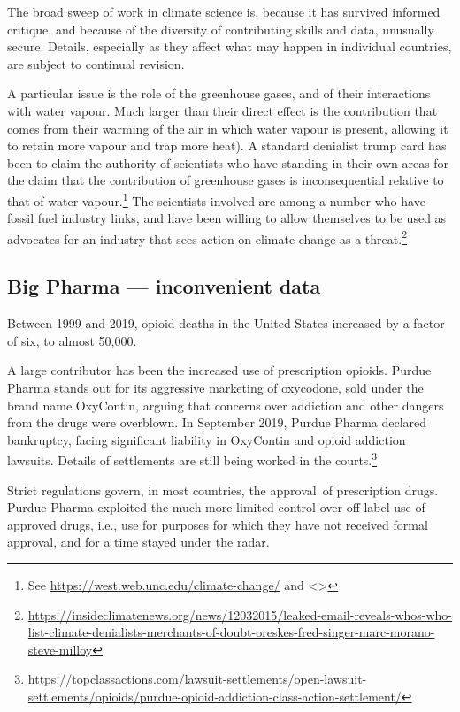 \documentclass[
  10pt,
  b5paper]{book}
\begin{document}
The broad sweep of work in climate science is, because it has survived
informed critique, and because of the diversity of contributing skills
and data, unusually secure. Details, especially as they affect what may
happen in individual countries, are subject to continual revision.

A particular issue is the role of the greenhouse gases, and of their
interactions with water vapour. Much larger than their direct effect
is the contribution that comes from their warming of the air in which
water vapour is present, allowing it to retain more vapour and trap
more heat). A standard denialist trump card has been to claim the
authority of scientists who have standing in their own areas for the
claim that the contribution of greenhouse gases is inconsequential
relative to that of water
vapour.\footnote{See \url{https://west.web.unc.edu/climate-change/} and
  \textless\textgreater{}}
The scientists involved are among a number who have fossil fuel
industry links, and have been willing to allow themselves to be
used as advocates for an industry that sees action on climate
change as a threat.\footnote{\url{https://insideclimatenews.org/news/12032015/leaked-email-reveals-whos-who-list-climate-denialists-merchants-of-doubt-oreskes-fred-singer-marc-morano-steve-milloy}}

\hypertarget{big-pharma-inconvenient-data}{%
\subsection*{Big Pharma --- inconvenient data}\label{big-pharma-inconvenient-data}}

Between 1999 and 2019, opioid deaths in the United States increased
by a factor of six, to almost 50,000.

A large contributor has been the increased use of prescription
opioids. Purdue Pharma stands out for its aggressive marketing of
oxycodone, sold under the brand name OxyContin, arguing that
concerns over addiction and other dangers from the drugs were
overblown. In September 2019, Purdue Pharma declared bankruptcy,
facing significant liability in OxyContin and opioid addiction
lawsuits. Details of settlements are still being worked in the
courts.\footnote{ \url{https://topclassactions.com/lawsuit-settlements/open-lawsuit-settlements/opioids/purdue-opioid-addiction-class-action-settlement/}}

Strict regulations govern, in most countries, the approval~of
prescription drugs. Purdue Pharma exploited the much more
limited control over off-label use of approved drugs, i.e.,
use for purposes for which they have not received formal
approval, and for a time stayed under the radar.
\end{document}
